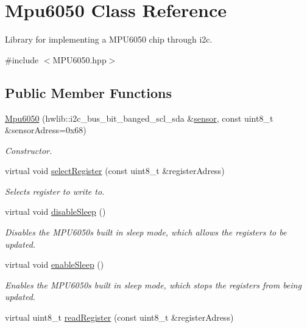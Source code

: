 \hypertarget{classMpu6050}{}\section{Mpu6050 Class Reference}
\label{classMpu6050}


Library for implementing a M\+P\+U6050 chip through i2c.  




{\ttfamily \#include $<$M\+P\+U6050.\+hpp$>$}

\subsection*{Public Member Functions}
\begin{DoxyCompactItemize}
\item 
\hyperlink{classMpu6050_af7beb7081101ae8d99452211c1d06789}{Mpu6050} (hwlib\+::i2c\+\_\+bus\+\_\+bit\+\_\+banged\+\_\+scl\+\_\+sda \&\hyperlink{classMpu6050_a03526c721c8d366b95d9c4cf9f19ef01}{sensor}, const uint8\+\_\+t \&sensor\+Adress=0x68)
\begin{DoxyCompactList}\small\item\em Constructor. \end{DoxyCompactList}\item 
virtual void \hyperlink{classMpu6050_a2ea5f53f3c5afec1c2a0fe55bf028599}{select\+Register} (const uint8\+\_\+t \&register\+Adress)
\begin{DoxyCompactList}\small\item\em Selects register to write to. \end{DoxyCompactList}\item 
virtual void \hyperlink{classMpu6050_a34c0508df81ca0f2dbcf9b6fba21148e}{disable\+Sleep} ()
\begin{DoxyCompactList}\small\item\em Disables the M\+P\+U6050\textquotesingle{}s built in sleep mode, which allows the registers to be updated. \end{DoxyCompactList}\item 
virtual void \hyperlink{classMpu6050_a495edda1413fbc77ef66831a6f6da729}{enable\+Sleep} ()
\begin{DoxyCompactList}\small\item\em Enables the M\+P\+U6050\textquotesingle{}s built in sleep mode, which stops the registers from being updated. \end{DoxyCompactList}\item 
virtual uint8\+\_\+t \hyperlink{classMpu6050_a4a5c30be51cae90371221b41518cfd84}{read\+Register} (const uint8\+\_\+t \&register\+Adress)

\end{DoxyCompactItemize}
